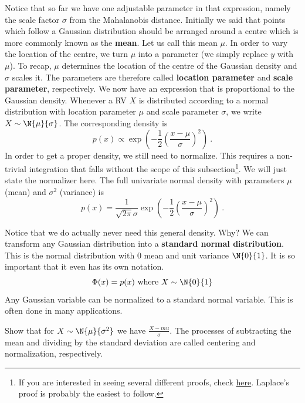 Notice that so far we have one adjustable parameter in that expression, namely the scale factor $ \sigma $ from the Mahalanobis distance. Initially we said
that points which follow a Gaussian distribution should be arranged around a centre which is more commonly known as the \textbf{mean}. 
Let us call this mean $ \mu $. In order to vary the location of the centre,
we turn $ \mu $ into a parameter (we simply replace $ y $ with $ \mu $). To recap, $ \mu $ determines the location
of the centre of the Gaussian density and $ \sigma $ scales it. The parameters are therefore called \textbf{location parameter} and \textbf{scale parameter}, respectively.
We now have an expression that is proportional to the Gaussian density. Whenever a RV $ X $ is distributed according to a normal distribution with location parameter
$ \mu $ and scale parameter $ \sigma $, we write $ X \sim \N{\mu}{\sigma} $. The corresponding density is
\begin{equation}
p(x) \propto \exp\left(-\frac{1}{2} \left(\frac{x - \mu}{\sigma}\right)^{2} \right) \ .
\end{equation}
In order to get a proper density, we still need to normalize. This requires a non-trivial integration that falls without the scope of this subsection\footnote{If
you are interested in seeing several different proofs, check \href{https://en.wikipedia.org/wiki/Gaussian_integral}{here}. Laplace's proof is probably the easiest to follow.}. We
will just state the normalizer here. The full univariate normal density with parameters $ \mu $ (mean) and $ \sigma^{2} $ (variance) is
\begin{equation}
p(x) = \frac{1}{\sqrt{2\pi}\sigma} \exp\left(-\frac{1}{2} \left(\frac{x - \mu}{\sigma}\right)^{2} \right) \ .
\end{equation}

Notice that we do actually never need this general density. Why? We can transform any Gaussian distribution into a \textbf{standard normal distribution}. This is 
the normal distribution with 0 mean and unit variance $ \N{0}{1} $. It is so important that it even has its own notation. 
\begin{equation}
\Phi(x) = p(x) \mbox{ where } X \sim \N{0}{1}
\end{equation}
Any Gaussian variable can be normalized to a standard normal variable. This is often done in many applications.

\begin{Exercise}
Show that for $ X \sim \N{\mu}{\sigma^{2}} $ we have $ \frac{X - mu}{\sigma} $. The processes of subtracting the mean and dividing
by the standard deviation are called centering and normalization, respectively.
\end{Exercise}

